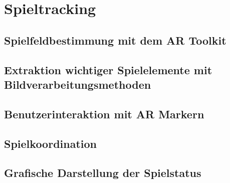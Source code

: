 \section{Spieltracking} %

\subsection{Spielfeldbestimmung mit dem AR Toolkit} %

\subsection{Extraktion wichtiger Spielelemente mit Bildverarbeitungsmethoden} %

\subsection{Benutzerinteraktion mit AR Markern} %

\subsection{Spielkoordination} %

\subsection{Grafische Darstellung der Spielstatus} %